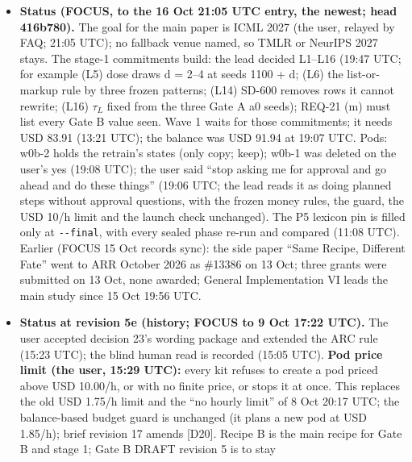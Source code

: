 \documentclass{article}
\theoremstyle{plain}
\theoremstyle{definition}
\theoremstyle{remark}
\begin{document}
\begin{itemize}
        recorded noise'') and the stage-1 pre-registration DRAFT revision 2 with
        a consolidated decision list (2ded100; ``104 items; 21 USER items due
        before wave 1''); neither was read in full here. The user's decisions of
        17 Oct (decision 48; decisions 26 and 28) are not in FOCUS yet.
  \item \textbf{Status (FOCUS, to the 16 Oct 21:05 UTC entry, the newest; head
        416b780).} The goal for the main paper is ICML 2027 (the user, relayed
        by FAQ; 21:05 UTC); no fallback venue named, so TMLR or NeurIPS 2027
        stays. The stage-1 commitments build: the lead decided L1--L16 (19:47
        UTC; for example (L5) dose draws d = 2--4 at seeds 1100 + d; (L6) the
        list-or-markup rule by three frozen patterns; (L14) SD-600 removes rows
        it cannot rewrite; (L16) $\tau_{L}$ fixed from the three Gate A a0
        seeds); REQ-21 (m) must list every Gate B value seen. Wave 1 waits for
        those commitments; it needs USD 83.91 (13:21 UTC); the balance was USD
        91.94 at 19:07 UTC. Pods: w0b-2 holds the retrain's states (only copy;
        keep); w0b-1 was deleted on the user's yes (19:08 UTC); the user said
        ``stop asking me for approval and go ahead and do these things'' (19:06
        UTC; the lead reads it as doing planned steps without approval
        questions, with the frozen money rules, the guard, the USD 10/h limit
        and the launch check unchanged). The P5 lexicon pin is filled only at
        \nolinkurl{--final}, with every sealed phase re-run and compared (11:08
        UTC). Earlier (FOCUS 15 Oct records sync): the side paper ``Same Recipe,
        Different Fate'' went to ARR October 2026 as \#13386 on 13 Oct; three
        grants were submitted on 13 Oct, none awarded; General Implementation VI
        leads the main study since 15 Oct 19:56 UTC.
  \item \textbf{Status at revision 5e (history; FOCUS to 9 Oct 17:22 UTC).} The
        user accepted decision 23's wording package and extended the ARC rule
        (15:23 UTC); the blind human read is recorded (15:05 UTC). \textbf{Pod
        price limit (the user, 15:29 UTC):} every kit refuses to create a pod
        priced above USD 10.00/h, or with no finite price, or stops it at once.
        This replaces the old USD 1.75/h limit and the ``no hourly limit'' of 8
        Oct 20:17 UTC; the balance-based budget guard is unchanged (it plans a
        new pod at USD 1.85/h); brief revision 17 amends [D20]. Recipe B is the
        main recipe for Gate B and stage 1; Gate B DRAFT revision 5 is to stay

\end{itemize}
\end{document}
